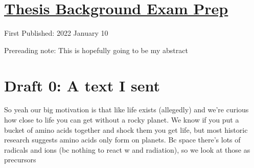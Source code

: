\documentclass[12pt]{article}[titlepage]
\newcommand{\1}{\={a}}
\newcommand{\2}{\={e}}
\newcommand{\3}{\={\i}}
\newcommand{\4}{\=o}
\newcommand{\5}{\=u}
\newcommand{\6}{\={A}}
\renewcommand{\,}{\textsuperscript{,}}
\begin{document}
\doublespacing
\section{\href{thesis-background-prep-1.html}{Thesis Background Exam Prep}}
First Published: 2022 January 10

Prereading note: This is hopefully going to be my abstract
\section{Draft 0: A text I sent}
So yeah our big motivation is that like life exists (allegedly) and we're curious how close to life you can get without a rocky planet. We know if you put a bucket of amino acids together and shock them you get life, but most historic research suggests amino acids only form on planets. Bc space there's lots of radicals and ions (bc nothing to react w and radiation), so we look at those as precursors
\end{document}
